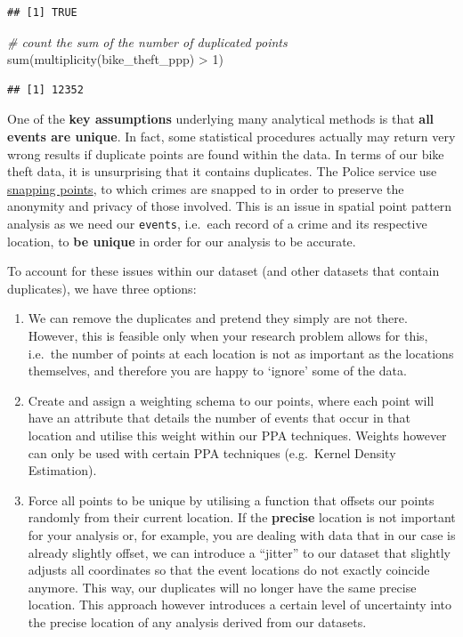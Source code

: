 \documentclass[
]{book}
\newenvironment{Shaded}{\begin{snugshade}}{\end{snugshade}}
\newcommand{\CommentTok}[1]{\textcolor[rgb]{0.56,0.35,0.01}{\textit{#1}}}
\newcommand{\DecValTok}[1]{\textcolor[rgb]{0.00,0.00,0.81}{#1}}
\newcommand{\FunctionTok}[1]{\textcolor[rgb]{0.00,0.00,0.00}{#1}}
\newcommand{\NormalTok}[1]{#1}
\newcommand{\SpecialCharTok}[1]{\textcolor[rgb]{0.00,0.00,0.00}{#1}}
\begin{document}
\begin{verbatim}
## [1] TRUE
\end{verbatim}

\begin{Shaded}
\begin{Highlighting}[]
\CommentTok{\# count the sum of the number of duplicated points}
\FunctionTok{sum}\NormalTok{(}\FunctionTok{multiplicity}\NormalTok{(bike\_theft\_ppp) }\SpecialCharTok{\textgreater{}} \DecValTok{1}\NormalTok{)}
\end{Highlighting}
\end{Shaded}

\begin{verbatim}
## [1] 12352
\end{verbatim}

One of the \textbf{key assumptions} underlying many analytical methods is that \textbf{all events are unique}. In fact, some statistical procedures actually may return very wrong results if duplicate points are found within the data. In terms of our bike theft data, it is unsurprising that it contains duplicates. The Police service use \href{https://data.police.uk/about/\#anonymisation}{snapping points}, to which crimes are snapped to in order to preserve the anonymity and privacy of those involved. This is an issue in spatial point pattern analysis as we need our \texttt{events}, i.e.~each record of a crime and its respective location, to \textbf{be unique} in order for our analysis to be accurate.

To account for these issues within our dataset (and other datasets that contain duplicates), we have three options:

\begin{enumerate}
\def\labelenumi{\arabic{enumi}.}
\item
  We can remove the duplicates and pretend they simply are not there. However, this is feasible only when your research problem allows for this, i.e.~the number of points at each location is not as important as the locations themselves, and therefore you are happy to `ignore' some of the data.
\item
  Create and assign a weighting schema to our points, where each point will have an attribute that details the number of events that occur in that location and utilise this weight within our PPA techniques. Weights however can only be used with certain PPA techniques (e.g.~Kernel Density Estimation).
\item
  Force all points to be unique by utilising a function that offsets our points randomly from their current location. If the \textbf{precise} location is not important for your analysis or, for example, you are dealing with data that in our case is already slightly offset, we can introduce a ``jitter'' to our dataset that slightly adjusts all coordinates so that the event locations do not exactly coincide anymore. This way, our duplicates will no longer have the same precise location. This approach however introduces a certain level of uncertainty into the precise location of any analysis derived from our datasets.
\end{enumerate}
\end{document}

